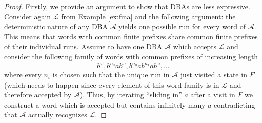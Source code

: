 \begin{proof}
  Firstly, we provide an argument to show that \acp{DBA} are less expressive.
  Consider again $\mathcal{L}$ from Example \ref{ex:fina} and the following
  argument: the deterministic nature of any \ac{DBA} $\mathcal{A}$ yields one
  possible run for every word of $\mathcal{A}$. This means that words with
  common finite prefixes share common finite prefixes of their individual runs.
  Assume to have one \ac{DBA} $\mathcal{A}$ which accepts $\mathcal{L}$ and
  consider the following family of words with common prefixes of increasing 
  length
  \begin{equation*}
    b^{\omega}, b^{n_{0}}ab^{\omega}, b^{n_{0}}ab^{n_{1}}ab^{\omega}, \dots
  \end{equation*}
  where every $n_{i}$ is chosen such that the unique run in $\mathcal{A}$
  just visited a state in $F$ (which needs to happen since every element of
  this word-family is in $\mathcal{L}$ and therefore accepted by
  $\mathcal{A}$). Thus, by iterating \enquote{sliding in} $a$ after a visit in
  $F$ we construct a word which is accepted but contains infinitely many $a$
  contradicting that $\mathcal{A}$ actually recognizes $\mathcal{L}$.


\end{proof}
